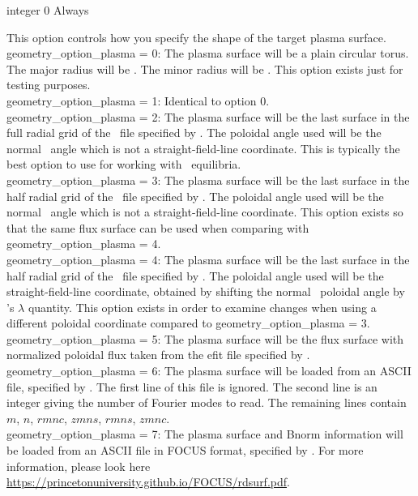 {integer}
{0}
{Always}
{This option controls how you specify the shape of the target plasma surface.\\

{\ttfamily geometry\_option\_plasma} = 0: The plasma surface will be a plain circular torus. The major radius will be .
     The minor radius will be . This option exists just for testing purposes.\\

{\ttfamily geometry\_option\_plasma} = 1: Identical to option 0.\\

{\ttfamily geometry\_option\_plasma} = 2: The plasma surface will be the last surface in the full radial grid of the \vmec~file specified by .
The poloidal angle used will be the normal \vmec~angle which is not a straight-field-line coordinate.
This is typically the best option to use for working with \vmec~equilibria.\\

{\ttfamily geometry\_option\_plasma} = 3: The plasma surface will be the last surface in the half radial grid of the \vmec~file specified by .
The poloidal angle used will be the normal \vmec~angle which is not a straight-field-line coordinate.
This option exists so that the same flux surface can be used when comparing with {\ttfamily geometry\_option\_plasma} = 4.\\

{\ttfamily geometry\_option\_plasma} = 4: The plasma surface will be the last surface in the half radial grid of the \vmec~file specified by .
The poloidal angle used will be the straight-field-line coordinate, obtained by shifting the normal \vmec~poloidal angle by \vmec's $\lambda$ quantity.
This option exists in order to examine changes when using a different poloidal coordinate compared to {\ttfamily geometry\_option\_plasma} = 3.\\

{\ttfamily geometry\_option\_plasma} = 5: The plasma surface will be the flux surface with normalized poloidal flux
 taken from the {\ttfamily efit} file specified by . \\

{\ttfamily geometry\_option\_plasma} = 6: The plasma surface will be loaded from an ASCII file, specified by . The first line of this file is ignored. The second line is an integer giving the number of Fourier modes
to read. The remaining lines contain $m$, $n$, $rmnc$, $zmns$, $rmns$, $zmnc$. \\

{\ttfamily geometry\_option\_plasma} = 7: The plasma surface and Bnorm information will be loaded from an ASCII file in FOCUS format, specified by . For more information, please look here \url{https://princetonuniversity.github.io/FOCUS/rdsurf.pdf}.

}

